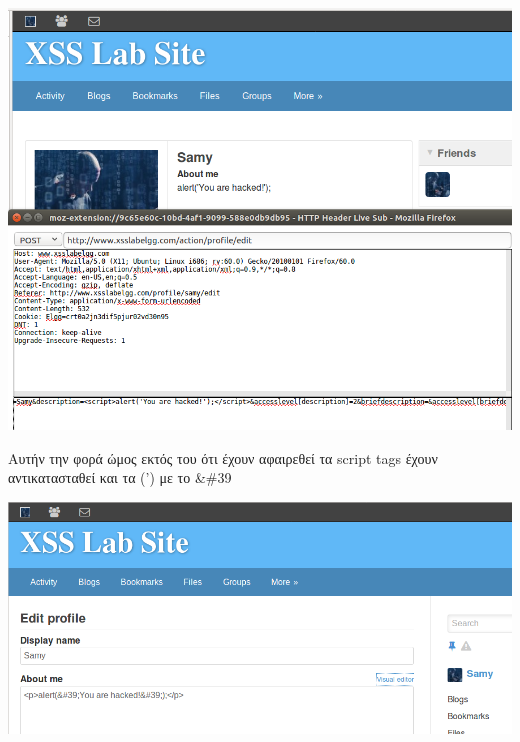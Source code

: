 \begin{center}
			\includegraphics[width=1\textwidth]{image/7.9.PNG}		
\end{center}
\noindent 
Αυτήν την φορά ώμος εκτός του ότι έχουν αφαιρεθεί τα script tags 
έχουν αντικατασταθεί και τα (') με το \&\#39
\begin{center}
			\includegraphics[width=1\textwidth]{image/7.10.PNG}		
\end{center}